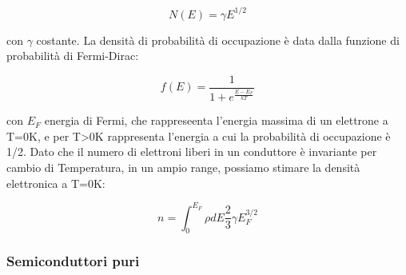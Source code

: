 \documentclass{article}
\begin{document}
\begin{equation}
    N(E) = \gamma E^{1/2}
\end{equation}

con $\gamma$ costante.
La densità di probabilità di occupazione è data dalla funzione di probabilità di Fermi-Dirac:

\begin{equation}
    f(E) = \frac{1}{1+e^{\frac{E-E_F}{kT}}}
\end{equation}

con $E_F$ energia di Fermi, che rappreseenta l'energia massima di un elettrone a T=0K, e per T>0K rappresenta l'energia a cui la probabilità di occupazione è 1/2.
Dato che il numero di elettroni liberi in un conduttore è invariante per cambio di Temperatura, in un ampio range,
possiamo stimare la densità elettronica a T=0K:

\begin{equation}
    n = \int_{0}^{E_F} \rho dE \frac{2}{3}\gamma E_F^{3/2}
\end{equation}

\subsubsection{Semiconduttori puri}
\end{document}
